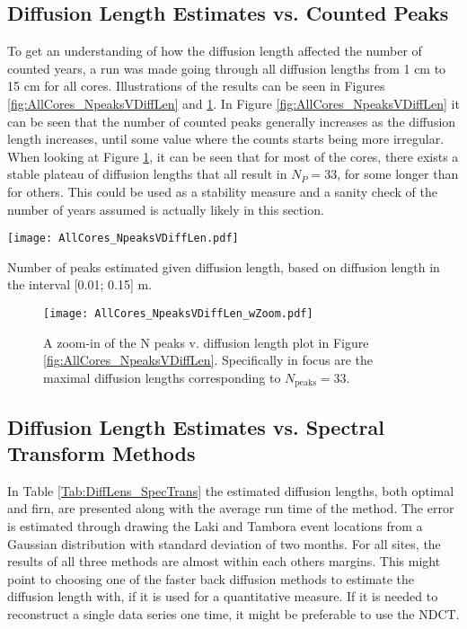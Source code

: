\documentclass[../../CompleteThesis2/Complete_2ndDraft]{subfiles}
\begin{document}
\subsection[Diffusion Length V N Peaks]{Diffusion Length Estimates vs. Counted Peaks}
\label{Subsec:Results_DiffLenEst_AlphabetCores_DiffLenVPeaks}
To get an understanding of how the diffusion length affected the number of counted years, a run was made going through all diffusion lengths from 1 cm to 15 cm for all cores. Illustrations of the results can be seen in Figures \ref{fig:AllCores_NpeaksVDiffLen} and \ref{fig:AllCores_NpeaksVDiffLenZoom}. In Figure \ref{fig:AllCores_NpeaksVDiffLen} it can be seen that the number of counted peaks generally increases as the diffusion length increases, until some value where the counts starts being more irregular. 
When looking at Figure \ref{fig:AllCores_NpeaksVDiffLenZoom}, it can be seen that for most of the cores, there exists a stable plateau of diffusion lengths that all result in $N_P=33$, for some longer than for others. This could be used as a stability measure and a sanity check of the number of years assumed is actually likely in this section. 

\begin{marginfigure}
	\centering
	\texttt{[image: AllCores\_NpeaksVDiffLen.pdf]}
	\caption[$\sigma$ vs. N Peaks]{\footnotesize Number of peaks estimated given diffusion length, based on diffusion length in the interval [0.01; 0.15] m.}
	\label{fig:AllCores_NpeaksVDiffLen}
\end{marginfigure}

\begin{figure}[h]
	\centering
	\texttt{[image: AllCores\_NpeaksVDiffLen\_wZoom.pdf]}
	\caption[$\sigma$ vs. N Peaks]{\small A zoom-in of the N peaks v. diffusion length plot in Figure \ref{fig:AllCores_NpeaksVDiffLen}. Specifically in focus are the maximal diffusion lengths corresponding to $N_{\text{peaks}}=33$.}
	\label{fig:AllCores_NpeaksVDiffLenZoom}
\end{figure}



\subsection[$\sigma$ v. Spectral Transforms]{Diffusion Length Estimates vs. Spectral Transform Methods}
\label{Subsec:Results_DiffLenEst_AlphabetCores_SpectralTransforms}
In Table \ref{Tab:DiffLens_SpecTrans} the estimated diffusion lengths, both optimal and firn, are presented along with the average run time of the method. The error is estimated through drawing the Laki and Tambora event locations from a Gaussian distribution with standard deviation of two months. For all sites, the results of all three methods are almost within each others margins. This might point to choosing one of the faster back diffusion methods to estimate the diffusion length with, if it is used for a quantitative measure. If it is needed to reconstruct a single data series one time, it might be preferable to use the NDCT.
\end{document}
